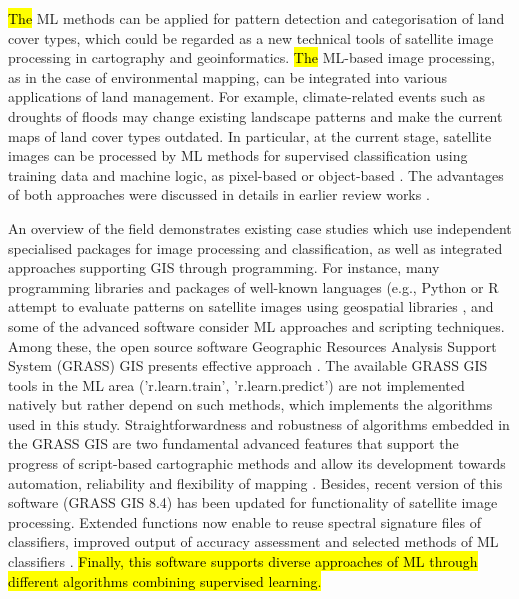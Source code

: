 \documentclass[12pt,a4paper,oneside]{article}
\def \newpar{\vspace{6pt}}
\begin{document}
\newpar \hl{The} ML methods can be applied for pattern detection and categorisation of land cover types, which could be regarded as a new technical tools of satellite image processing in cartography and geoinformatics. \hl{The} ML-based image processing, as in the case of environmental mapping, can be integrated into various applications of land management. For example, climate-related events such as droughts of floods may change existing landscape patterns and make the current maps of land cover types outdated. In particular, at the current stage, satellite images can be processed by ML methods for supervised classification using training data and machine logic, as pixel-based \citep{RAHMAN2020100410,AYOADE2023337} or object-based \citep{KARILA2023100046,Lemenkova202024,Lemenkova201528}. The advantages of both approaches were discussed in details in earlier review works \citep{NASIRI2023103555,ABUJAYYAB2023101802}. 

\newpar An overview of the field demonstrates existing case studies which use independent specialised packages for image processing and classification, as well as integrated approaches supporting GIS through programming. For instance, many programming libraries and packages of well-known languages (e.g., Python or R \citep{Lemenkova202324} attempt to evaluate patterns on satellite images using geospatial libraries \citep{geomatics5010005,lemenkova2024approche}, and some of the advanced software consider ML approaches and scripting techniques. Among these, the open source software Geographic Resources Analysis Support System (GRASS) GIS presents effective approach \citep{NETELER2012124,MitasovaNeteler}. The available GRASS GIS  tools in the ML area ('r.learn.train', 'r.learn.predict') are not implemented natively but rather depend on such methods, which implements the algorithms used in this study. Straightforwardness and robustness of algorithms embedded in the GRASS GIS are two fundamental advanced features that support the progress of script-based cartographic methods and allow its development towards automation, reliability and flexibility of mapping \citep{ROCCHINI201382,Lemenkova202307,ROCCHINI2017166}. Besides, recent version of this software (GRASS GIS 8.4) has been updated for functionality of satellite image processing. Extended functions now enable to reuse spectral signature files of classifiers, improved output of accuracy assessment and selected methods of ML classifiers \citep{Nartiss}. \hl{Finally, this software supports diverse approaches of ML through different algorithms combining supervised learning.}
\end{document}
